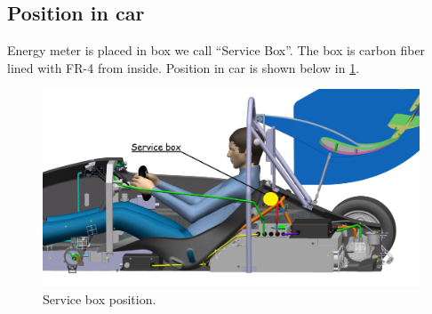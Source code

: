 \subsection{Position in car}
 

Energy meter is placed in box we call “Service Box”. The box is carbon fiber lined with FR-4 from inside. Position in car is shown below in \ref{fig:ServiceBox-position}.

\begin{figure}[H]
	\centering
	\includegraphics[width=\textwidth]{./img/ServiceBox-position.jpg}
	\caption{Service box position.}
	\label{fig:ServiceBox-position}
\end{figure}





